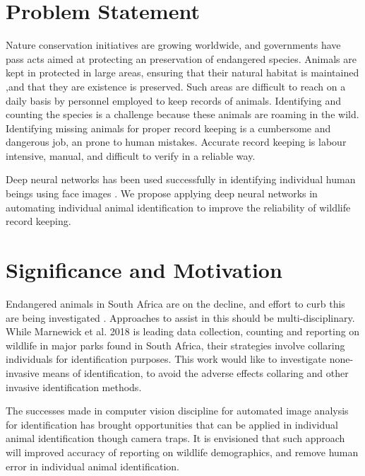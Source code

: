 \section{Problem Statement}
Nature conservation initiatives are growing worldwide, and governments have pass acts aimed at protecting an preservation of endangered species. Animals are kept in protected in large areas, ensuring that their natural habitat is maintained ,and that they are existence is preserved. 
Such areas are difficult to reach on a daily basis by personnel employed to keep records of animals. Identifying and counting the species is a challenge because these animals are roaming in the wild. Identifying missing animals for proper record keeping is a cumbersome and dangerous job, an prone to human mistakes. Accurate record keeping is labour intensive, manual, and difficult to verify in a reliable way.  

Deep neural networks has been used successfully in identifying individual human beings using face images \cite{parkhi2015deep} \cite{schroff2015facenet}. We propose applying deep neural networks in automating individual animal identification to improve the reliability of wildlife record keeping. 

\section{Significance and Motivation}
Endangered  animals in South Africa are on the decline, and effort to curb this are being investigated \cite{marnewick2008evaluating}. Approaches to assist in this should be  multi-disciplinary. While Marnewick et al. 2018 \cite{marnewick2018cheetaprob} is leading data collection, counting and reporting on wildlife in major parks found in South Africa, their strategies involve collaring individuals for identification purposes. 
This work would like to investigate none-invasive means of identification, to avoid the adverse effects collaring and other invasive identification methods. 

The successes made in computer vision discipline for automated image analysis for identification has brought opportunities that can be applied in individual animal identification though camera traps. It is envisioned that such approach will improved accuracy of reporting on wildlife demographics, and remove human error in individual animal identification. 

